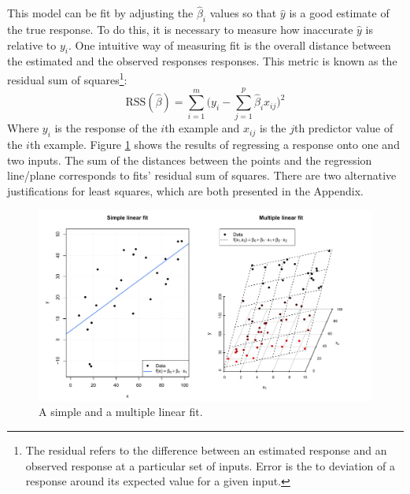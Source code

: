 \documentclass[11pt,a4paper,article]{memoir} %
\begin{document}
This model can be fit by adjusting the $\hat{\beta}_i$ values so that $\hat{y}$ is a good estimate of the true response. To do this, it is necessary to measure how inaccurate $\hat{y}$ is relative to $y_i$. One intuitive way of measuring fit is the overall distance between the estimated and the observed responses responses. This metric is known as the residual sum of squares\footnote{The residual refers to the difference between an estimated response and an observed response at a particular set of inputs. Error is the to deviation of a response around its expected value for a given input.}:
\begin{equation}
	\text{RSS}(\hat{\beta}) = \sum_{i = 1}^m \Big(y_i - \sum_{j = 1}^p \hat{\beta}_i x_{ij})^2
	\label{eq:rss}
\end{equation}
Where $y_i$ is the response of the $i$th example and $x_{ij}$ is the $j$th predictor value of the $i$th example. Figure \ref{fig:linear_regression} shows the results of regressing a response onto one and two inputs. The sum of the distances between the points and the regression line/plane corresponds to fits' residual sum of squares. There are two alternative justifications for least squares, which are both presented in the Appendix. 
\begin{figure}
\includegraphics[width=\textwidth]{linear_fits.pdf}
\caption{A simple and a multiple linear fit.}
\label{fig:linear_regression}
\end{figure}
\end{document}
